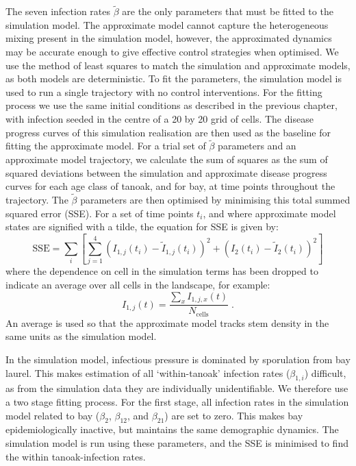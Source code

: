 The seven infection rates $\tilde{\beta}$ are the only parameters that must be fitted to the simulation model. The approximate model cannot capture the heterogeneous mixing present in the simulation model, however, the approximated dynamics may be accurate enough to give effective control strategies when optimised. We use the method of least squares to match the simulation and approximate models, as both models are deterministic. To fit the parameters, the simulation model is used to run a single trajectory with no control interventions. For the fitting process we use the same initial conditions as described in the previous chapter, with infection seeded in the centre of a 20 by 20 grid of cells. The disease progress curves of this simulation realisation are then used as the baseline for fitting the approximate model. For a trial set of $\tilde{\beta}$ parameters and an approximate model trajectory, we calculate the sum of squares as the sum of squared deviations between the simulation and approximate disease progress curves for each age class of tanoak, and for bay, at time points throughout the trajectory. The $\tilde{\beta}$ parameters are then optimised by minimising this total summed squared error (SSE). For a set of time points $t_i$, and where approximate model states are signified with a tilde, the equation for SSE is given by:
\begin{equation}
    \mathrm{SSE} = \sum_{i}\left[\sum_{j=1}^4\left(I_{1,j}(t_i) - \tilde{I}_{1,j}(t_i)\right)^2 + \left(I_{2}(t_i) - \tilde{I}_{2}(t_i)\right)^2\right]
\end{equation}
where the dependence on cell in the simulation terms has been dropped to indicate an average over all cells in the landscape, for example:
\begin{equation}
    I_{1,j}(t) = \frac{\sum_xI_{1,j,x}(t)}{N_\textrm{cells}}\;.
\end{equation}
An average is used so that the approximate model tracks stem density in the same units as the simulation model.

In the simulation model, infectious pressure is dominated by sporulation from bay laurel. This makes estimation of all `within-tanoak' infection rates ($\beta_{1,i}$) difficult, as from the simulation data they are individually unidentifiable. We therefore use a two stage fitting process. For the first stage, all infection rates in the simulation model related to bay ($\beta_2$, $\beta_{12}$, and $\beta_{21}$) are set to zero. This makes bay epidemiologically inactive, but maintains the same demographic dynamics. The simulation model is run using these parameters, and the SSE is minimised to find the within tanoak-infection rates.

